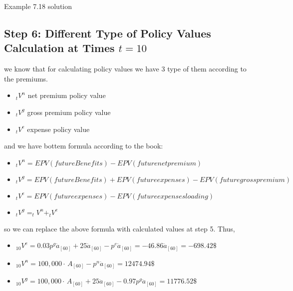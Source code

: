 \begin{solve}{}{Example 7.18 solution}
	\subsection*{Step 6: Different Type of Policy Values Calculation at Times \(t = 10\)}
	we know that for calculating policy values we have 3 type of them according to the premiums.
	\begin{itemize}
		\item $_tV^n$ net premium policy value
		\item $_tV^g$ gross premium policy value
		\item $_tV^e$ expense policy value
		\end{itemize}
		and we have bottem formula according to the book:
		\begin{itemize}
		\item $_tV^n = EPV(future Benefits) - EPV(future net premium)$ 
		\item $_tV^g = EPV(future Benefits) + EPV(future expenses) - EPV(future gross premium)$ 
		\item $_tV^e = EPV(future expenses) - EPV(future expenses loading)$ 
		\item $ _tV^g = _tV^n + _tV^e$
		\end{itemize}
		so we can replace the above formula with calculated values at step 5. Thus,
			\begin{itemize}
			\item $_{10}V^e = 0.03 p^g \ddot{a}_{[60]} + 25\ddot{a}_{[60]} - p^e \ddot{a}_{[60]} = -46.86 \ddot{a}_{[60]} = -698.42 \$$ 
			\item $_{10}V^n = 100,000 \cdot \,  A_{[60]} - p^n \ddot{a}_{[60]} = 12474.94 \$$ 
			\item $_{10}V^g = 100,000 \cdot \,  A_{[60]} + 25 \ddot{a}_{[60]} - 0.97 p^g \ddot{a}_{[60]} = 11776.52 \$$ 
		\end{itemize}		
	\end{solve}
	
	\vspace{2ex}
	
	
	
%	
%	
%	

